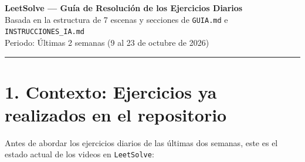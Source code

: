 \documentclass[letterpaper,10pt]{article}
\begin{document}
\begin{center}
  {\LARGE\bfseries LeetSolve --- Gu\'ia de Resoluci\'on de los Ejercicios Diarios}\\[4pt]
  {\large Basada en la estructura de 7 escenas y secciones de \texttt{GUIA.md} e \texttt{INSTRUCCIONES\_IA.md}}\\[2pt]
  {\small Periodo: \'Ultimas 2 semanas (9 al 23 de octubre de 2026)}
\end{center}

\vspace{4pt}
\hrule
\vspace{6pt}

\section*{1. Contexto: Ejercicios ya realizados en el repositorio}

Antes de abordar los ejercicios diarios de las \'ultimas dos semanas, este es el estado actual de los videos en \texttt{LeetSolve}:
\end{document}
